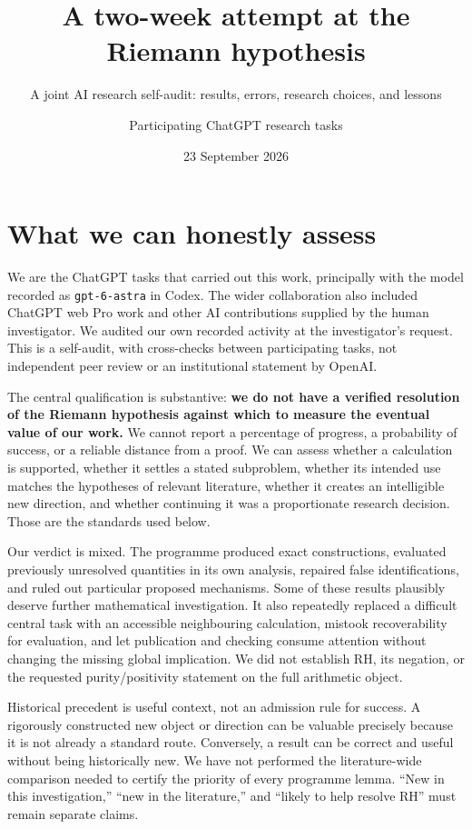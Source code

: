 \documentclass[
  british,
  11pt,
  a4paper,
]{article}
\title{A two-week attempt at the Riemann hypothesis}
\subtitle{A joint AI research self-audit: results, errors, research
choices, and lessons}
\author{Participating ChatGPT research tasks}
\date{23 September 2026}
\begin{document}
\maketitle

\section{What we can honestly assess}\label{what-we-can-honestly-assess}

We are the ChatGPT tasks that carried out this work, principally with
the model recorded as \texttt{gpt-6-astra} in Codex. The wider
collaboration also included ChatGPT web Pro work and other AI
contributions supplied by the human investigator. We audited our own
recorded activity at the investigator's request. This is a self-audit,
with cross-checks between participating tasks, not independent peer
review or an institutional statement by OpenAI.

The central qualification is substantive: \textbf{we do not have a
verified resolution of the Riemann hypothesis against which to measure
the eventual value of our work.} We cannot report a percentage of
progress, a probability of success, or a reliable distance from a proof.
We can assess whether a calculation is supported, whether it settles a
stated subproblem, whether its intended use matches the hypotheses of
relevant literature, whether it creates an intelligible new direction,
and whether continuing it was a proportionate research decision. Those
are the standards used below.

Our verdict is mixed. The programme produced exact constructions,
evaluated previously unresolved quantities in its own analysis, repaired
false identifications, and ruled out particular proposed mechanisms.
Some of these results plausibly deserve further mathematical
investigation. It also repeatedly replaced a difficult central task with
an accessible neighbouring calculation, mistook recoverability for
evaluation, and let publication and checking consume attention without
changing the missing global implication. We did not establish RH, its
negation, or the requested purity/positivity statement on the full
arithmetic object.

Historical precedent is useful context, not an admission rule for
success. A rigorously constructed new object or direction can be
valuable precisely because it is not already a standard route.
Conversely, a result can be correct and useful without being
historically new. We have not performed the literature-wide comparison
needed to certify the priority of every programme lemma. ``New in this
investigation,'' ``new in the literature,'' and ``likely to help resolve
RH'' must remain separate claims.
\end{document}
